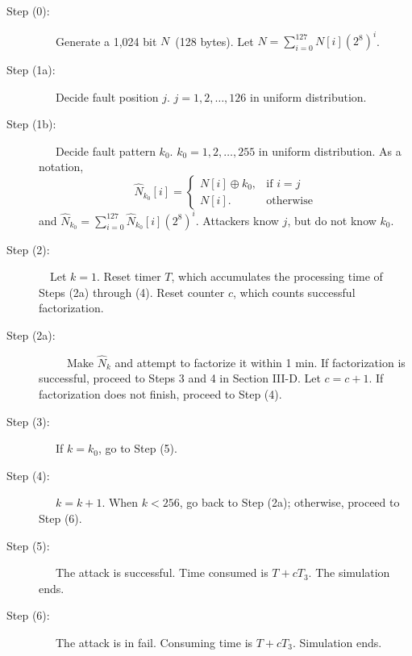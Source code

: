 \documentclass{article}
\begin{document}
\begin{description}
\item[Step (0):] ~~~Generate a 1,024 bit $N$~(128 bytes). Let $N=\sum_{i=0}^{127}N[i](2^8)^i$. 
\item[Step (1a):] ~~~Decide fault position $j$.  $j = 1, 2,\ldots,126$ in uniform distribution. 
\item[Step (1b):] ~~~Decide fault pattern $k_0$. $k_0 = 1,2,\ldots,255$ in uniform distribution.
As a notation, 
$$
\hat{N}_{k_0}[i]=\left\{\begin{array}{ll}
N[i]\oplus k_0, & \mbox{if }i=j \\
N[i]. & \mbox{otherwise}
\end{array}
\right.
$$
and $\hat{N}_{k_0} = \sum_{i=0}^{127}\hat{N}_{k_0}[i](2^8)^i$.
Attackers know $j$, but do not know $k_0$.
\item[Step (2):] ~~Let $k=1$. 
Reset timer $T$, which accumulates the processing time of Steps (2a) through (4).
Reset counter $c$, which counts successful factorization.
\item[Step (2a):] ~~~~~Make $\hat{N}_k$ and attempt to factorize it within 1 min. 
If factorization is successful, proceed to Steps 3 and 4 in Section III-D. Let $c=c+1$.
If factorization does not finish, proceed to Step (4).
\item[Step (3):] ~~~If $k=k_0$, go to Step (5).
\item[Step (4):] ~~~$k=k+1$.
When $k<256$, go back to Step (2a); otherwise, proceed to Step (6).
\item[Step (5):] ~~~The attack is successful. Time consumed is $T + cT_3$. 
The simulation ends.
\item[Step (6):] ~~~The attack is in fail. Consuming time is $T + cT_3$. Simulation ends.
\end{description}
\end{document}
